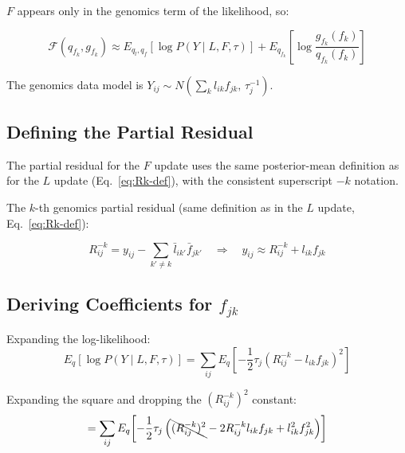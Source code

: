 \documentclass{article}[12pt]
\newcommand{\lbar}[2]{\bar{l}_{#1#2}}
\newcommand{\fbar}[2]{\bar{f}_{#1#2}}
\begin{document}
$F$ appears only in the genomics term of the likelihood, so:

\begin{equation}
    \mathcal{F}(q_{f_k}, g_{f_k})
    \approx E_{q_l,q_f}\!\left[\log P(Y \mid L, F, \tau)\right]
    + E_{q_{f_k}}\!\left[\log \frac{g_{f_k}(f_k)}{q_{f_k}(f_k)}\right]
\end{equation}

The genomics data model is $Y_{ij} \sim N\!\left(\sum_k l_{ik}f_{jk},\,\tau_j^{-1}\right)$.

\subsection{Defining the Partial Residual}

\begin{correctionbox}[title={Item 2 Fix: Consistent Notation for $F$ Update}]
The partial residual for the $F$ update uses the same posterior-mean definition
as for the $L$ update (Eq.~\ref{eq:Rk-def}), with the consistent superscript
$-k$ notation.
\end{correctionbox}

The $k$-th genomics partial residual (same definition as in the $L$ update,
Eq.~\ref{eq:Rk-def}):

\begin{equation}
    R^{-k}_{ij} = y_{ij} - \sum_{k'\neq k}\lbar{i}{k'}\fbar{j}{k'}
    \quad\Rightarrow\quad
    y_{ij} \approx R^{-k}_{ij} + l_{ik}f_{jk}
\end{equation}

\subsection{Deriving Coefficients for $f_{jk}$}

Expanding the log-likelihood:
\begin{equation}
    E_{q}\!\left[\log P(Y \mid L, F, \tau)\right]
    = \sum_{ij}E_{q}\!\left[
        -\frac{1}{2}\tau_j\left(R^{-k}_{ij} - l_{ik}f_{jk}\right)^2
      \right]
\end{equation}

Expanding the square and dropping the $(R^{-k}_{ij})^2$ constant:
\begin{equation}
    = \sum_{ij}E_{q}\!\left[
        -\frac{1}{2}\tau_j\left(
          \bcancel{(R^{-k}_{ij})^2}
          - 2R^{-k}_{ij}l_{ik}f_{jk}
          + l_{ik}^2 f_{jk}^2
        \right)
      \right]
\end{equation}
\end{document}
